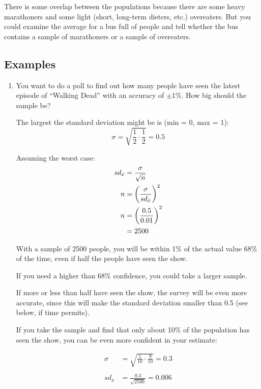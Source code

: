 \documentclass[letterpaper]{exam}
\begin{document}
  There is some overlap between the populations because there are some heavy
  marathoners and some light (short, long-term dieters, etc.) overeaters. But
  you could examine the average for a bus full of people and tell whether the
  bus contains a sample of marathoners or a sample of overeaters.

  \subsection{Examples}
  \begin{enumerate}

    \item You want to do a poll to find out how many people have seen the latest
      episode of ``Walking Dead'' with an accuracy of $\pm 1\%$. How big should
      the sample be? 

      \begin{solution}
        The largest the standard deviation might be is (min = 0, max = 1):
        \[
          \sigma = \sqrt{\frac{1}{2} \cdot \frac{1}{2}} = 0.5
        \]

        Assuming the worst case:
        \begin{align*}
          sd_{\bar{x}} & = \frac{\sigma}{\sqrt{n}} \\
          n            & = \del{ \frac{\sigma}{sd_{\bar{x}}} }^2 \\
          n            & = \del{ \frac{0.5}{0.01} }^2 \\
                       & = 2500 \\
        \end{align*}

        With a sample of 2500 people, you will be within 1\% of the actual value
        68\% of the time, even if half the people have seen the show. 
        
        If you need a higher than 68\% confidence, you could take a larger
        sample.

        If more or less than half have seen the show, the survey will be even
        more accurate, since this will make the standard deviation smaller than
        0.5 (see below, if time permits).

        If you take the sample and find that only about 10\% of the population
        has seen the show, you can be even more confident in your estimate:

        \begin{align*}
          \sigma & = \sqrt{\frac{1}{10} \cdot \frac{9}{10}} = 0.3 \\
          \\
          sd_{\bar{x}} & = \frac{0.3}{\sqrt{2500}} = 0.006 \\
        \end{align*}


\end{solution}
\end{enumerate}
\end{document}
